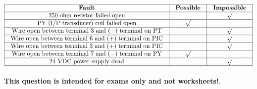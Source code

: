 






$$\vbox{\offinterlineskip
\halign{\strut
\vrule \quad\hfil # \ \hfil & 
\vrule \quad\hfil # \ \hfil & 
\vrule \quad\hfil # \ \hfil \vrule \cr
\noalign{\hrule}
%
{\bf Fault} & {\bf Possible} & {\bf Impossible} \cr
%
\noalign{\hrule}
%
250 ohm resistor failed open &  & $\surd$ \cr
%
\noalign{\hrule}
%
PY (I/P transducer) coil failed open & $\surd$ &  \cr
%
\noalign{\hrule}
%
Wire open between terminal 3 and ($-$) terminal on PT &  & $\surd$ \cr
%
\noalign{\hrule}
%
Wire open between terminal 6 and (+) terminal on PIC &  & $\surd$ \cr
%
\noalign{\hrule}
%
Wire open between terminal 3 and (+) terminal on PIC &  & $\surd$ \cr
%
\noalign{\hrule}
%
Wire open between terminal 7 and ($-$) terminal on PY & $\surd$ &  \cr
%
\noalign{\hrule}
%
24 VDC power supply dead &  & $\surd$ \cr
%
\noalign{\hrule}
} %
}$$ %







{\bf This question is intended for exams only and not worksheets!}.




